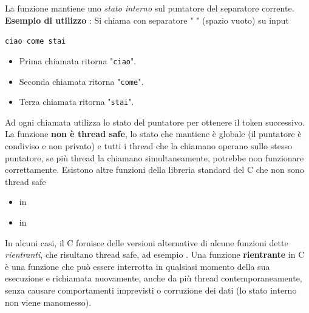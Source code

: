 \documentclass[10pt, letterpaper]{report}
\begin{document}
La funzione mantiene uno \textit{stato interno} sul puntatore del separatore corrente.\acc 
\textbf{Esempio di utilizzo} : Si chiama  con separatore " " (spazio vuoto) su input \begin{center}
    \texttt{ciao come stai}
\end{center}
\begin{itemize}
    \item Prima chiamata  ritorna "\texttt{ciao}".
    \item Seconda chiamata  ritorna "\texttt{come}".
    \item Terza chiamata  ritorna "\texttt{stai}".
\end{itemize}
Ad ogni chiamata utilizza lo stato del puntatore per ottenere il token successivo. La funzione \textbf{non è thread safe}, lo stato che mantiene è globale (il puntatore è condiviso e non privato) e tutti i thread che la chiamano operano sullo stesso puntatore, se più thread la chiamano simultaneamente, potrebbe non funzionare correttamente.\acc 
Esistono altre funzioni della libreria standard del C che non sono thread safe\begin{itemize}
    \item {} in 
    \item {} in  
\end{itemize}
In alcuni casi, il C fornisce delle versioni alternative di alcune funzioni dette \textit{rientranti}, che risultano thread safe, ad esempio . \acc 
{} Una funzione \textbf{rientrante} in C è una funzione che può essere interrotta in qualsiasi momento della sua esecuzione e richiamata nuovamente, anche da più thread contemporaneamente, senza causare comportamenti imprevisti o corruzione dei dati (lo stato interno non viene manomesso).
\flowerLine 
\end{document}
